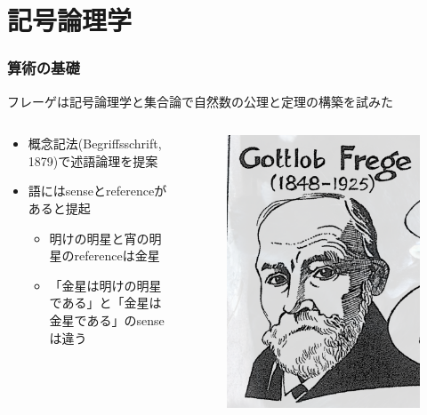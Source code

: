 \documentclass[unicode, 14pt, aspectratio=169]{beamer}
\begin{document}
\section{記号論理学}
\begin{frame}
  \frametitle{算術の基礎}
  {\large フレーゲは記号論理学と集合論で自然数の公理と定理の構築を試みた}
  \begin{columns}
    \begin{column}{0.8\textwidth}
      \begin{itemize}
      \item 概念記法(Begriffsschrift, 1879)で述語論理を提案
      \item 語にはsenseとreferenceがあると提起
        \begin{itemize}
        \item 明けの明星と宵の明星のreferenceは金星
        \item 「金星は明けの明星である」と「金星は金星である」のsenseは違う
        \end{itemize}
      \end{itemize}
    \end{column}    
    \begin{column}{0.2\textwidth}
      \begin{figure}
        \includegraphics[width=1\textwidth]{images/frege.png}
      \end{figure}       
    \end{column} 
  \end{columns}
\end{frame}
\end{document}
